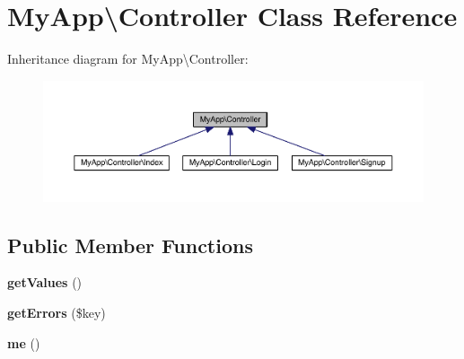 \hypertarget{class_my_app_1_1_controller}{}\section{My\+App\textbackslash{}Controller Class Reference}
\label{class_my_app_1_1_controller}


Inheritance diagram for My\+App\textbackslash{}Controller\+:
\nopagebreak
\begin{figure}[H]
\begin{center}
\leavevmode
\includegraphics[width=350pt]{class_my_app_1_1_controller__inherit__graph}
\end{center}
\end{figure}
\subsection*{Public Member Functions}
\begin{DoxyCompactItemize}
\item 
{\bfseries get\+Values} ()\hypertarget{class_my_app_1_1_controller_aed15f2fb497e55d07f80c7a709c89943}{}\label{class_my_app_1_1_controller_aed15f2fb497e55d07f80c7a709c89943}

\item 
{\bfseries get\+Errors} (\$key)\hypertarget{class_my_app_1_1_controller_a43bd03dfa3857358733da41dabc3beea}{}\label{class_my_app_1_1_controller_a43bd03dfa3857358733da41dabc3beea}

\item 
{\bfseries me} ()\hypertarget{class_my_app_1_1_controller_aa8bbf0425e272480670e0e01a32ef6bb}{}\label{class_my_app_1_1_controller_aa8bbf0425e272480670e0e01a32ef6bb}

\end{DoxyCompactItemize}
